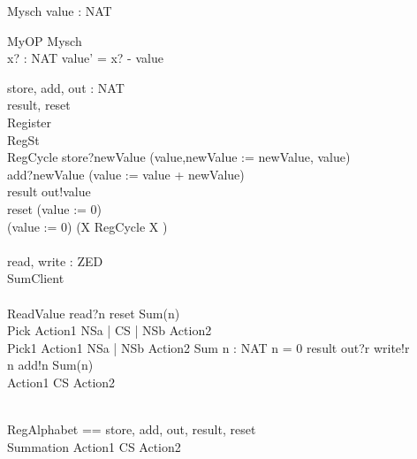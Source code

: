 
\begin{zed}
\end{zed}
\begin{schema}{Mysch}
value : NAT
\end{schema}

\begin{schema}{MyOP}
\Delta Mysch\\
x? : NAT
\where
value' = x? - value
\end{schema}

\begin{circus}
\circchannel store, add, out : NAT\\
\circchannel result, reset\\

\circprocess Register \circdef\\
	\circbegin \circstate RegSt \\
	RegCycle \circdef store?newValue \then (value,newValue := newValue, value)\\
	\extchoice add?newValue \then (value := value + newValue)\\
	\extchoice result \then out!value \then \Skip\\
	\extchoice reset \then (value := 0)\\
\circspot (value := 0) \circseq (\circmu X \circspot RegCycle \circseq X )\\
	\circend\\

\circchannel read, write : ZED\\
\circprocess SumClient \circdef\\
	\circbegin\\
	ReadValue \circdef read?n \then reset \then Sum(n)\\
	Pick \circdef Action1 \lpar NSa | CS | NSb \rpar Action2\\
	Pick1 \circdef Action1 \linter NSa | NSb \rinter Action2 
	Sum \circdef n : NAT \circspot \lcircguard n = 0 \rcircguard \circguard result \then out?r \then write!r \then \Skip\\
	\extchoice \lcircguard n  \rcircguard \circguard add!n \then Sum(n)\\
	\circspot Action1 \lpar CS \rpar Action2\\
	\circend\\
\end{circus}
\begin{circus}
\circchannelset RegAlphabet == \lchanset store, add, out, result, reset \rchanset\\
\circprocess Summation \circdef Action1 \lpar CS \rpar Action2
\end{circus}

